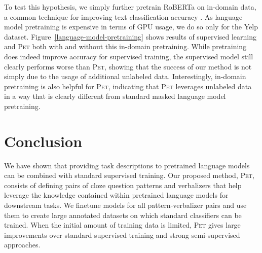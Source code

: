 To test this hypothesis, we simply further pretrain RoBERTa on in-domain data, a common technique for improving text classification accuracy \citep[e.g.,][]{howard2018universal,chi2019finetune}. As language model pretraining is expensive in terms of GPU usage, we do so only for the Yelp dataset.
Figure~\ref{language-model-pretraining} shows results of supervised learning and \textsc{Pet} both with and without this in-domain pretraining. While pretraining does indeed improve accuracy for supervised training, the supervised model still clearly performs worse than \textsc{Pet}, showing that the success of our method is not simply due to the usage of additional unlabeled data. Interestingly, in-domain pretraining is also helpful for \textsc{Pet}, indicating that \textsc{Pet} leverages unlabeled data in a way that is clearly different from  standard masked language model pretraining.

\section{Conclusion}

We have shown that providing task descriptions to pretrained language models can be combined with standard supervised training. Our proposed method, \textsc{Pet}, consists of defining pairs of cloze question patterns and verbalizers that help leverage the knowledge contained within pretrained language models for downstream tasks. We finetune models for all pattern-verbalizer pairs and use them to create large annotated datasets on which standard classifiers can be trained. When the initial amount of training data is limited, \textsc{Pet} gives large improvements over standard supervised training and strong semi-supervised approaches.


